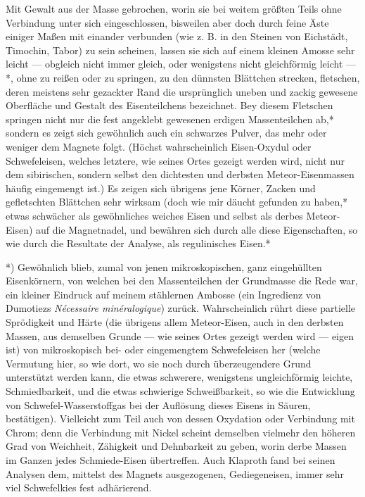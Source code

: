 \documentclass[a4paper, 11pt, oneside, german]{article}
\begin{document}
Mit Gewalt aus der Masse gebrochen, worin sie bei weitem größten Teils ohne Verbindung unter sich eingeschlossen, bisweilen aber doch durch feine Äste einiger Maßen mit einander verbunden (wie z. B. in den Steinen von Eichstädt, Timochin, Tabor) zu sein scheinen, lassen sie sich auf einem kleinen Amosse sehr leicht --- obgleich nicht immer gleich, oder wenigstens nicht gleichförmig leicht --- *, ohne zu reißen oder zu springen, zu den dünnsten Blättchen strecken, fletschen, deren meistens sehr gezackter Rand die ursprünglich uneben und zackig gewesene Oberfläche und Gestalt des Eisenteilchens bezeichnet. Bey diesem Fletschen springen nicht nur die fest angeklebt gewesenen erdigen Massenteilchen ab,* sondern es zeigt sich gewöhnlich auch ein schwarzes Pulver, das mehr oder weniger dem Magnete folgt. (Höchst wahrscheinlich Eisen-Oxydul oder Schwefeleisen, welches letztere, wie seines Ortes gezeigt werden wird, nicht nur dem sibirischen, sondern selbst den dichtesten und derbsten Meteor-Eisenmassen häufig eingemengt ist.) Es zeigen sich übrigens jene Körner, Zacken und gefletschten Blättchen sehr wirksam (doch wie mir däucht gefunden zu haben,* etwas schwächer als gewöhnliches weiches Eisen und selbst als derbes Meteor-Eisen) auf die Magnetnadel, und bewähren sich durch alle diese Eigenschaften, so wie durch die Resultate der Analyse, als regulinisches Eisen.*

*) Gewöhnlich blieb, zumal von jenen mikroskopischen, ganz eingehüllten Eisenkörnern, von welchen bei den Massenteilchen der Grundmasse die Rede war, ein kleiner Eindruck auf meinem stählernen Ambosse (ein Ingredienz von Dumotiezs \emph{Nécessaire minéralogique}) zurück. Wahrscheinlich rührt diese partielle Sprödigkeit und Härte (die übrigens allem Meteor-Eisen, auch in den derbsten Massen, aus demselben Grunde --- wie seines Ortes gezeigt werden wird --- eigen ist) von mikroskopisch bei- oder eingemengtem Schwefeleisen her (welche Vermutung hier, so wie dort, wo sie noch durch überzeugendere Grund unterstützt werden kann, die etwas schwerere, wenigstens ungleichförmig leichte, Schmiedbarkeit, und die etwas schwierige Schweißbarkeit, so wie die Entwicklung von Schwefel-Wasserstoffgas bei der Auflösung dieses Eisens in Säuren, bestätigen). Vielleicht zum Teil auch von dessen Oxydation oder Verbindung mit Chrom; denn die Verbindung mit Nickel scheint demselben vielmehr den höheren Grad von Weichheit, Zähigkeit und Dehnbarkeit zu geben, worin derbe Massen im Ganzen jedes Schmiede-Eisen übertreffen. Auch Klaproth fand bei seinen Analysen dem, mittelst des Magnets ausgezogenen, Gediegeneisen, immer sehr viel Schwefelkies fest adhärierend.
\end{document}
